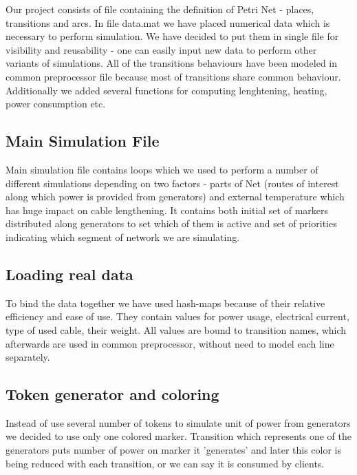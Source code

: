 \documentclass[a4paper]{article}
\begin{document}
Our project consists of file containing the definition of Petri Net - places, transitions and arcs. In file data.mat we have placed numerical data which is necessary to perform simulation. We have decided to put them in single file for visibility and reusability - one can easily input new data to perform other variants of simulations. All of the transitions behaviours have been modeled in common preprocessor file because most of transitions share common behaviour. Additionally we added several functions for computing lenghtening, heating, power consumption etc.

\subsection{Main Simulation File}
\label{sec:mainSimulationFile}

Main simulation file contains loops which we used to perform a number of different simulations depending on two factors - parts of Net (routes of interest along which power is provided from generators) and external temperature which has huge impact on cable lengthening. It contains both initial set of markers distributed along generators to set which of them is active and set of priorities indicating which segment of network we are simulating.

\subsection{Loading real data}
\label{sec:loadingRealData}

To bind the data together we have used hash-maps because of their relative efficiency and ease of use. They contain values for power usage, electrical current, type of used cable, their weight. All values are bound to transition names, which afterwards are used in common preprocessor, without need to model each line separately.

\subsection{Token generator and coloring}
\label{sec:tokenGeneratorAndColoring}

Instead of use several number of tokens to simulate unit of power from generators we decided to use only one colored marker. Transition which represents one of the generators puts number of power on marker it 'generates' and later this color is being reduced with each transition, or we can say it is consumed by clients.
\end{document}
